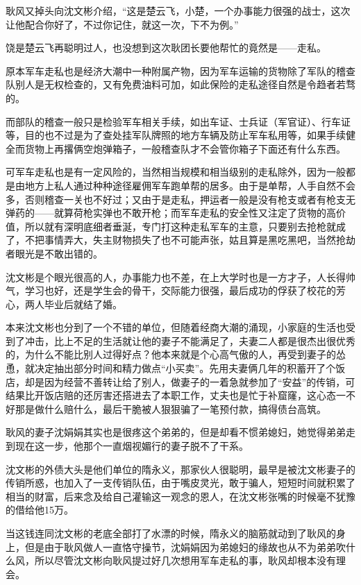 耿风又掉头向沈文彬介绍，“这是楚云飞，小楚，一个办事能力很强的战士，这次让他配合你好了，不过你记住，就这一次，下不为例。”

饶是楚云飞再聪明过人，也没想到这次耿团长要他帮忙的竟然是——走私。

原本军车走私也是经济大潮中一种附属产物，因为军车运输的货物除了军队的稽查队别人是无权检查的，又有免费油料可加，如此保险的走私途径自然是令趋者若骛的。

而部队的稽查一般只是检验军车相关手续，如出车证、士兵证（军官证）、行车证等，目的也不过是为了查处挂军队牌照的地方车辆及防止军车私用等，如果手续健全而货物上再撂俩空炮弹箱子，一般稽查队才不会管你箱子下面还有什么东西。

可军车走私也是有一定风险的，当然相当规模和相当级别的走私除外，因为一般都是由地方上私人通过种种途径雇佣军车跑单帮的居多。由于是单帮，人手自然不会多，否则稽查一关也不好过；又由于是走私，押运者一般是没有枪支或者有枪支无弹药的——就算荷枪实弹也不敢开枪；而军车走私的安全性又注定了货物的高价值，所以就有深明底细者垂涎，专门打这种走私军车的主意，只要别去抢枪就成了，不把事情弄大，失主财物损失了也不可能声张，姑且算是黑吃黑吧，当然抢劫者眼光是不敢出错的。

沈文彬是个眼光很高的人，办事能力也不差，在上大学时也是一方才子，人长得帅气，学习也好，还是学生会的骨干，交际能力很强，最后成功的俘获了校花的芳心，两人毕业后就结了婚。

本来沈文彬也分到了一个不错的单位，但随着经商大潮的涌现，小家庭的生活也受到了冲击，比上不足的生活就让他的妻子不能满足了，夫妻二人都是很杰出很优秀的，为什么不能比别人过得好点？他本来就是个心高气傲的人，再受到妻子的怂恿，就决定抽出部分时间和精力做点“小买卖”。先用夫妻俩几年的积蓄开了个饭店，却是因为经营不善转让给了别人，做妻子的一着急就参加了“安益”的传销，可结果比开饭店赔的还厉害还搭进去了本职工作，丈夫也是忙于补窟窿，这心态一不好那是做什么赔什么，最后干脆被人狠狠骗了一笔预付款，搞得债台高筑。

耿风的妻子沈娟娟其实也是很疼这个弟弟的，但是却看不惯弟媳妇，她觉得弟弟走到现在这一步，他那个一直烟视媚行的妻子脱不了干系。

沈文彬的外债大头是他们单位的隋永义，那家伙人很聪明，最早是被沈文彬妻子的传销所惑，也加入了一支传销队伍，由于嘴皮灵光，敢于骗人，短短时间就积累了相当的财富，后来念及给自己灌输这一观念的恩人，在沈文彬张嘴的时候毫不犹豫的借给他15万。

当这钱连同沈文彬的老底全部打了水漂的时候，隋永义的脑筋就动到了耿风的身上，但是由于耿风做人一直恪守操节，沈娟娟因为弟媳妇的缘故也从不为弟弟吹什么风，所以尽管沈文彬向耿风提过好几次想用军车走私的事，耿风却根本没有理会。

